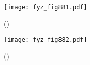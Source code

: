     \begin{figure}[ht!] %
      \centering
      \texttt{[image: fyz\_fig881.pdf]}
      \caption{
               (\cite[s.~707]{Feynman02})}
      \label{fyz_fig881}
    \end{figure}

    \begin{figure}[ht!] %
      \centering
      \texttt{[image: fyz\_fig882.pdf]}
      \caption{
               (\cite[s.~707]{Feynman02})}
      \label{fyz_fig882}
    \end{figure}



\printbibliography[title={Seznam literatury},heading=subbibliography]
